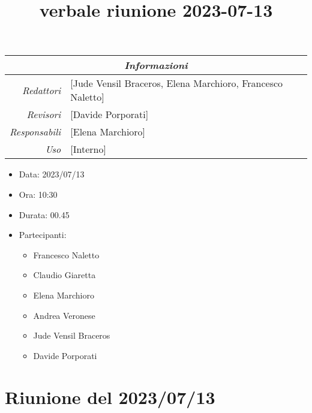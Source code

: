 \documentclass[12pt]{article}
\begin{document}
\graphicspath{ {../../templates/img} }

\title{verbale riunione 2023-07-13}

\firstPage
\maketitle

\begin{center}
\begin{tabular}{r | l}
    \multicolumn{2}{c}{\textit{Informazioni}}\\
    \hline
    
        \textit{Redattori} &
        [Jude Vensil Braceros, Elena Marchioro, Francesco Naletto]\makecell{}\\
    
        \textit{Revisori} &
        [Davide Porporati]\makecell{}\\
        \textit{Responsabili} &
        [Elena Marchioro]\makecell{}\\
            \textit{Uso} & 
            [Interno]\makecell{}\\
\end{tabular}
    \begin{itemize}
    \item[] Data: 2023/07/13
    \item[] Ora: 10:30
    \item[] Durata: 00.45
    \item[] Partecipanti:
    \begin{itemize}
    \item[] Francesco Naletto
    \item[] Claudio Giaretta
    \item[] Elena Marchioro
    \item[] Andrea Veronese
    \item[] Jude Vensil Braceros
    \item[] Davide Porporati
    \end{itemize}
\end{itemize}
\end{center}


\tableofcontents
\printindex 
\section{Riunione del 2023/07/13}
\end{document}

